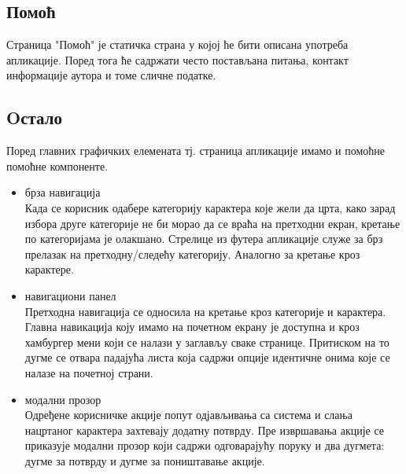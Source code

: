 \documentclass[a4paper]{article}
\begin{document}
\subsection{Помоћ}
\label{help}
Страница "Помоћ" је статичка страна у којој ће бити описана употреба апликације. Поред тога ће садржати често постављана питања, контакт информације аутора и томе сличне податке.

\subsection{Oстало}
Поред главних графичких елемената тј. страница апликације имамо и помоћне помоћне компоненте.
\begin{itemize}
\item брза навигација\\
Када се корисник одабере категорију карактера које жели да црта, како зарад избора друге категорије не би морао да се враћа на претходни екран, кретање по категоријама је олакшано. Стрелице из футера апликације служе за брз прелазак на претходну/следећу категорију. Аналогно за кретање кроз карактере.
\item навигациони панел\\
Претходна навигација се односила на кретање кроз категорије и карактера. Главна навикација коју имамо на почетном екрану је доступна и кроз хамбургер мени који се налази у заглављу сваке странице. Притиском на то дугме се отвара падајућа листа која садржи опције идентичне онима које се налазе на почетној страни.
\item модални прозор\\
Одређене корисничке акције попут одјављивања са система и слања нацртаног карактера захтевају додатну потврду. Пре извршавања акције се приказује модални прозор који садржи одговарајућу поруку и два дугмета: дугме за потврду и дугме за поништавање акције.
\end{itemize}
\end{document}
